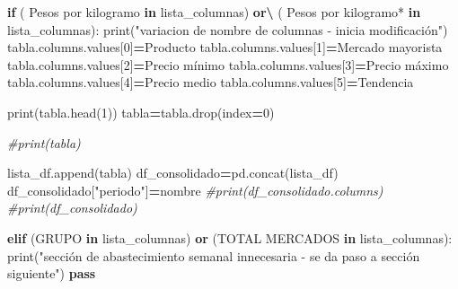 \documentclass[
]{book}
\newenvironment{Shaded}{\begin{snugshade}}{\end{snugshade}}
\newcommand{\BuiltInTok}[1]{#1}
\newcommand{\CommentTok}[1]{\textcolor[rgb]{0.56,0.35,0.01}{\textit{#1}}}
\newcommand{\ControlFlowTok}[1]{\textcolor[rgb]{0.13,0.29,0.53}{\textbf{#1}}}
\newcommand{\DecValTok}[1]{\textcolor[rgb]{0.00,0.00,0.81}{#1}}
\newcommand{\KeywordTok}[1]{\textcolor[rgb]{0.13,0.29,0.53}{\textbf{#1}}}
\newcommand{\NormalTok}[1]{#1}
\newcommand{\OperatorTok}[1]{\textcolor[rgb]{0.81,0.36,0.00}{\textbf{#1}}}
\newcommand{\StringTok}[1]{\textcolor[rgb]{0.31,0.60,0.02}{#1}}
\begin{document}
\begin{Shaded}
\begin{Highlighting}[]
            \ControlFlowTok{if}\NormalTok{ (}\StringTok{\textquotesingle{}          Pesos por kilogramo\textquotesingle{}} \KeywordTok{in}\NormalTok{ lista\_columnas) }\KeywordTok{or}\OperatorTok{\textbackslash{}}
\NormalTok{            (}\StringTok{\textquotesingle{}          Pesos por kilogramo*\textquotesingle{}} \KeywordTok{in}\NormalTok{ lista\_columnas):}
                \BuiltInTok{print}\NormalTok{(}\StringTok{"variacion de nombre de columnas {-} inicia modificación"}\NormalTok{)}
\NormalTok{                tabla.columns.values[}\DecValTok{0}\NormalTok{]}\OperatorTok{=}\StringTok{\textquotesingle{}Producto\textquotesingle{}}
\NormalTok{                tabla.columns.values[}\DecValTok{1}\NormalTok{]}\OperatorTok{=}\StringTok{\textquotesingle{}Mercado mayorista\textquotesingle{}}
\NormalTok{                tabla.columns.values[}\DecValTok{2}\NormalTok{]}\OperatorTok{=}\StringTok{\textquotesingle{}Precio mínimo\textquotesingle{}}
\NormalTok{                tabla.columns.values[}\DecValTok{3}\NormalTok{]}\OperatorTok{=}\StringTok{\textquotesingle{}Precio máximo\textquotesingle{}}
\NormalTok{                tabla.columns.values[}\DecValTok{4}\NormalTok{]}\OperatorTok{=}\StringTok{\textquotesingle{}Precio medio\textquotesingle{}}
\NormalTok{                tabla.columns.values[}\DecValTok{5}\NormalTok{]}\OperatorTok{=}\StringTok{\textquotesingle{}Tendencia\textquotesingle{}}
                
                \BuiltInTok{print}\NormalTok{(tabla.head(}\DecValTok{1}\NormalTok{))}
\NormalTok{                tabla}\OperatorTok{=}\NormalTok{tabla.drop(index}\OperatorTok{=}\DecValTok{0}\NormalTok{)}
                
                
                \CommentTok{\#print(tabla)}
                
\NormalTok{                lista\_df.append(tabla)}
\NormalTok{                df\_consolidado}\OperatorTok{=}\NormalTok{pd.concat(lista\_df)}
\NormalTok{                df\_consolidado[}\StringTok{"periodo"}\NormalTok{]}\OperatorTok{=}\NormalTok{nombre}
                \CommentTok{\#print(df\_consolidado.columns)   }
                \CommentTok{\#print(df\_consolidado)}
                
            
            \ControlFlowTok{elif}\NormalTok{ (}\StringTok{\textquotesingle{}GRUPO\textquotesingle{}} \KeywordTok{in}\NormalTok{ lista\_columnas) }\KeywordTok{or}\NormalTok{ (}\StringTok{\textquotesingle{}TOTAL MERCADOS\textquotesingle{}} \KeywordTok{in}\NormalTok{ lista\_columnas):}
                \BuiltInTok{print}\NormalTok{(}\StringTok{"sección de abastecimiento semanal innecesaria {-} se da paso a sección siguiente"}\NormalTok{)}
                \ControlFlowTok{pass}
            

\end{Highlighting}
\end{Shaded}
\end{document}
